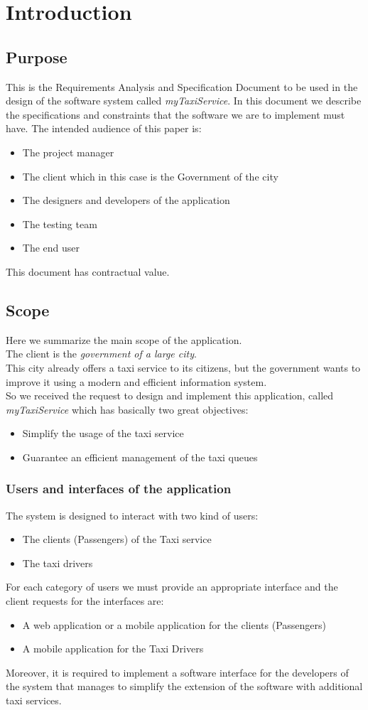 \chapter{Introduction}

\section{Purpose}
This is the Requirements Analysis and Specification Document to be used in the design of the software system called \textit{myTaxiService}. In this document we describe the specifications and constraints that the software we are to implement must have.
The intended audience of this paper is:
\begin{itemize}
\item The project manager
\item The client which in this case is the Government of the city
\item The designers and developers of the application
\item The testing team
\item The end user
\end{itemize}
This document has contractual value.
\section{Scope}
Here we summarize the main scope of the application.\\
The client is the \textit{government of a large city}.\\
This city already offers a taxi service to its citizens, but the government wants to improve it using a modern and efficient information system.\\
So we received the request to design and implement this application, called \textit{myTaxiService} which has basically two great objectives:
\begin{itemize}
\item Simplify the usage of the taxi service
\item Guarantee an efficient management of the taxi queues
\end{itemize}
\subsection{Users and interfaces of the application}
The system is designed to interact with two kind of users:
\begin{itemize}
\item The clients (Passengers) of the Taxi service
\item The taxi drivers
\end{itemize}
For each category of users we must provide an appropriate interface and the client requests for the interfaces are:
\begin{itemize}
\item A web application or a mobile application for the clients (Passengers)
\item A mobile application for the Taxi Drivers
\end{itemize}
Moreover, it is required to implement a software interface for the developers of the system that manages to simplify the extension of the software with additional taxi services.
